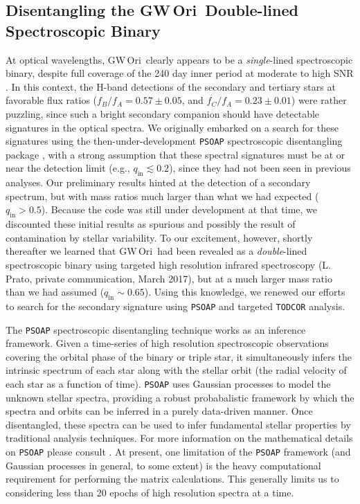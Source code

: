 \documentclass[twocolumn]{aastex61}
\newcommand{\gw}{GW\,Ori}
\begin{document}
\subsection{Disentangling the \gw\ Double-lined Spectroscopic Binary}
At optical wavelengths, \gw\ clearly appears to be a \emph{single}-lined spectroscopic binary, despite full coverage of the 240 day inner period at moderate to high SNR \citep{mathieu91,fang14}. In this context, the \citet{berger11} H-band detections of the secondary and tertiary stars at favorable flux ratios ($f_B / f_A = 0.57 \pm 0.05$, and $f_C / f_A = 0.23 \pm 0.01$) were rather puzzling, since such a bright secondary companion should have detectable signatures in the optical spectra. We originally embarked on a search for these signatures using the then-under-development \texttt{PSOAP} spectroscopic disentangling package \citep{czekala17}, with a strong assumption that these spectral signatures must be at or near the detection limit (e.g., $q_\mathrm{in} \lesssim 0.2$), since they had not been seen in previous analyses. Our preliminary results hinted at the detection of a secondary spectrum, but with mass ratios much larger than what we had expected ($q_\mathrm{in} > 0.5$). Because the code was still under development at that time, we discounted these initial results as spurious and possibly the result of contamination by stellar variability. 
To our excitement, however, shortly thereafter we learned that \gw\ had been revealed as a \emph{double}-lined spectroscopic binary using targeted high resolution infrared spectroscopy (L. Prato, private communication, March 2017), but at a much larger mass ratio than we had assumed ($q_\mathrm{in} \sim 0.65$). Using this knowledge, we renewed our efforts to search for the secondary signature using \texttt{PSOAP} and targeted \texttt{TODCOR} analysis.


The \texttt{PSOAP} spectroscopic disentangling technique works as an inference framework. Given a time-series of high resolution spectroscopic observations covering the orbital phase of the binary or triple star, it simultaneously infers the intrinsic spectrum of each star along with the stellar orbit (the radial velocity of each star as a function of time). \texttt{PSOAP} uses Gaussian processes to model the unknown stellar spectra, providing a robust probabalistic framework by which the spectra and orbits can be inferred in a purely data-driven manner. Once disentangled, these spectra can be used to infer fundamental stellar properties by traditional analysis techniques. For more information on the mathematical details on \texttt{PSOAP} please consult \citet{czekala17}. At present, one limitation of the \texttt{PSOAP} framework (and Gaussian processes in general, to some extent) is the heavy computational requirement for performing the matrix calculations. This generally limits us to considering less than 20 epochs of high resolution spectra at a time.  
\end{document}
